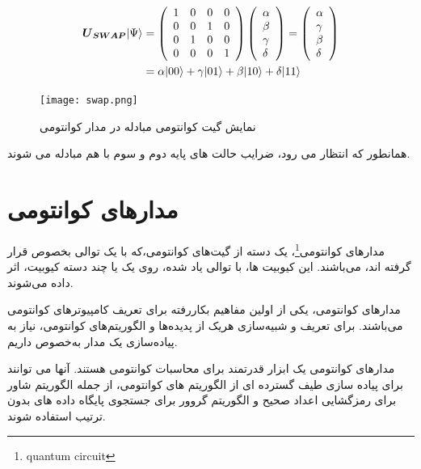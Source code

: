 \documentclass{book}
\begin{document}
\begin{center}
	$$\begin{aligned}
		\boldsymbol{U}_{\boldsymbol{SWAP}}|\Psi\rangle & =\left(\begin{array}{llll}
			1 & 0 & 0 & 0 \\
			0 & 0 & 1 & 0 \\
			0 & 1 & 0 & 0 \\
			0 & 0 & 0 & 1
		\end{array}\right)\left(\begin{array}{l}
			\alpha \\
			\beta \\
			\gamma \\
			\delta
		\end{array}\right)=\left(\begin{array}{l}
			\alpha \\
			\gamma \\
			\beta \\
			\delta
		\end{array}\right) \\
		\vspace{2cm}
		& =\alpha|00\rangle+\gamma|01\rangle+\beta|10\rangle+\delta|11\rangle
	\end{aligned}$$
\end{center}





\begin{figure}[ht]
	\centering
	\texttt{[image: swap.png]}
	\caption{نمایش گیت کوانتومی مبادله در مدار کوانتومی}
	\label{SWAP}
\end{figure}



همانطور که انتظار می رود، ضرایب حالت های پایه دوم و سوم با هم مبادله می شوند.
\section{مدار‌های کوانتومی}
مدار‌های ‌کوانتومی\footnote{quantum circuit}، یک دسته از گیت‌ها‌ی کوانتومی،که با یک توالی بخصوص قرار گرفته اند، ‌می‌باشند. این کیوبیت ها، با توالی یاد شده، روی یک یا چند دسته کیوبیت، اثر داده ‌می‌شوند. 

مدار‌های کوانتومی، یکی از اولین مفاهیم بکار‌رفته برای تعریف کامپیوتر‌های کوانتومی‌ می‌باشند. برای تعریف و شبیه‌سازی هریک از پدیده‌ها و الگوریتم‌های کوانتومی، نیاز به پیاده‌سازی یک مدار به‌خصوص داریم.


مدارهای کوانتومی یک ابزار قدرتمند برای محاسبات کوانتومی هستند. آنها می توانند برای پیاده سازی طیف گسترده ای از الگوریتم های کوانتومی، از جمله الگوریتم شاور برای رمزگشایی اعداد صحیح و الگوریتم گروور برای جستجوی پایگاه داده های بدون ترتیب استفاده شوند.
\end{document}
